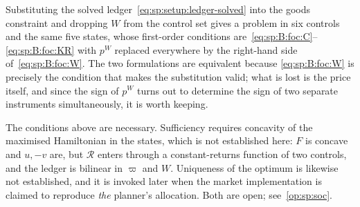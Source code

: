 \begin{remark}\label{rem:sp:B:reduced}
Substituting the solved ledger~\eqref{eq:sp:setup:ledger-solved} into the goods constraint and dropping
$W$ from the control set gives a problem in six controls and the same five states, whose first-order
conditions are~\eqref{eq:sp:B:foc:C}--\eqref{eq:sp:B:foc:KR} with $p^W$ replaced everywhere by the
right-hand side of~\eqref{eq:sp:B:foc:W}. The two formulations are equivalent because
\eqref{eq:sp:B:foc:W} is precisely the condition that makes the substitution valid; what is lost is the
price itself, and since the sign of $p^W$ turns out to determine the sign of two separate instruments
simultaneously, it is worth keeping.
\end{remark}

\begin{remark}\label{rem:sp:B:soc}
The conditions above are necessary. Sufficiency requires concavity of the maximised Hamiltonian in the
states, which is not established here: $F$ is concave and $u,-v$ are, but $\mathcal R$ enters through a
constant-returns function of two controls, and the ledger is bilinear in $\varpi$ and $W$. Uniqueness of
the optimum is likewise not established, and it is invoked later when the market implementation is
claimed to reproduce \emph{the} planner's allocation. Both are open; see~\ref{op:sp:soc}.
\end{remark}
